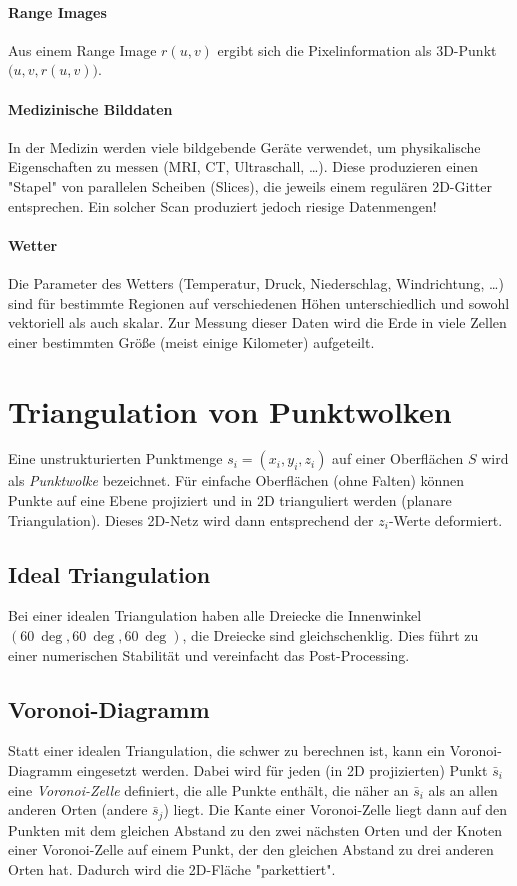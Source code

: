 		\paragraph{Range Images}
			Aus einem Range Image \( r(u, v) \) ergibt sich die Pixelinformation als 3D-Punkt \( \big(u, v, r(u, v)\big) \).

		\paragraph{Medizinische Bilddaten}
			In der Medizin werden viele bildgebende Geräte verwendet, um physikalische Eigenschaften zu messen (MRI, CT, Ultraschall, \dots). Diese produzieren einen "Stapel" von parallelen Scheiben (Slices), die jeweils einem regulären 2D-Gitter entsprechen. Ein solcher Scan produziert jedoch riesige Datenmengen!

		\paragraph{Wetter}
			Die Parameter des Wetters (\zB Temperatur, Druck, Niederschlag, Windrichtung, \dots) sind für bestimmte Regionen auf verschiedenen Höhen unterschiedlich und sowohl vektoriell als auch skalar. Zur Messung dieser Daten wird die Erde in viele Zellen einer bestimmten Größe (meist einige Kilometer) aufgeteilt.

	\section{Triangulation von Punktwolken}
		Eine unstrukturierten Punktmenge \( s_i = (x_i, y_i, z_i) \) auf einer Oberflächen \(S\) wird als \emph{Punktwolke} bezeichnet. Für einfache Oberflächen (ohne Falten) können Punkte auf eine Ebene projiziert und in 2D trianguliert werden (planare Triangulation). Dieses 2D-Netz wird dann entsprechend der \(z_i\)-Werte deformiert.

		\subsection{Ideal Triangulation}
			Bei einer idealen Triangulation haben alle Dreiecke die Innenwinkel \( (\SI{60}{\deg}, \SI{60}{\deg}, \SI{60}{\deg}) \), \dh die Dreiecke sind gleichschenklig. Dies führt zu einer numerischen Stabilität und vereinfacht das Post-Processing.

		\subsection{Voronoi-Diagramm}
			Statt einer idealen Triangulation, die schwer zu berechnen ist, kann ein Voronoi-Diagramm eingesetzt werden. Dabei wird für jeden (in 2D projizierten) Punkt \( \bar{s}_i \) eine \emph{Voronoi-Zelle} definiert, die alle Punkte enthält, die näher an \( \bar{s}_i \) als an allen anderen Orten (andere \( \bar{s}_j \)) liegt. Die Kante einer Voronoi-Zelle liegt dann auf den Punkten mit dem gleichen Abstand zu den zwei nächsten Orten und der Knoten einer Voronoi-Zelle auf einem Punkt, der den gleichen Abstand zu drei anderen Orten hat. Dadurch wird die 2D-Fläche "parkettiert".
		
